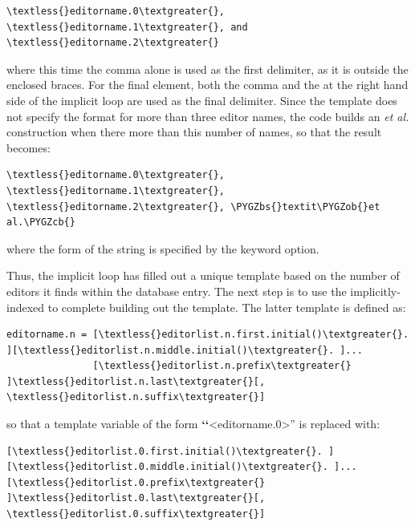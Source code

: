 \documentclass[letterpaper,10pt,english]{sphinxmanual}
\def\PYGZbs{\char`\\}
\def\PYGZob{\char`\{}
\def\PYGZcb{\char`\}}
\begin{document}
\begin{Verbatim}[commandchars=\\\{\}]
\textless{}editorname.0\textgreater{}, \textless{}editorname.1\textgreater{}, and \textless{}editorname.2\textgreater{}
\end{Verbatim}

where this time the comma alone is used as the first delimiter, as it is outside the enclosed braces. For the final element, both the comma and the  at the right hand side of the implicit loop are used as the final delimiter. Since the template does not specify the format for more than three editor names, the code builds an \emph{et al.} construction when there more than this number of names, so that the result becomes:

\begin{Verbatim}[commandchars=\\\{\}]
\textless{}editorname.0\textgreater{}, \textless{}editorname.1\textgreater{}, \textless{}editorname.2\textgreater{}, \PYGZbs{}textit\PYGZob{}et al.\PYGZcb{}
\end{Verbatim}

where the form of the string  is specified by the  keyword option.

Thus, the implicit loop has filled out a unique template based on the number of editors it finds within the database entry. The next step is to use the implicitly-indexed  to complete building out the template. The latter template is defined as:

\begin{Verbatim}[commandchars=\\\{\}]
editorname.n = [\textless{}editorlist.n.first.initial()\textgreater{}. ][\textless{}editorlist.n.middle.initial()\textgreater{}. ]...
               [\textless{}editorlist.n.prefix\textgreater{} ]\textless{}editorlist.n.last\textgreater{}[, \textless{}editorlist.n.suffix\textgreater{}]
\end{Verbatim}

so that a template variable of the form {\color{red}\bfseries{}{}`{}`}\textless{}editorname.0\textgreater{}'' is replaced with:

\begin{Verbatim}[commandchars=\\\{\}]
[\textless{}editorlist.0.first.initial()\textgreater{}. ][\textless{}editorlist.0.middle.initial()\textgreater{}. ]...
[\textless{}editorlist.0.prefix\textgreater{} ]\textless{}editorlist.0.last\textgreater{}[, \textless{}editorlist.0.suffix\textgreater{}]
\end{Verbatim}
\end{document}
